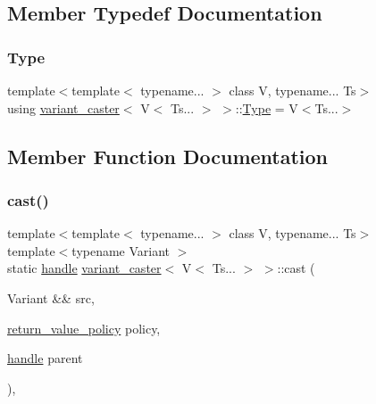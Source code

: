 \subsection{Member Typedef Documentation}
\mbox{\label{structvariant__caster_3_01_v_3_01_ts_8_8_8_01_4_01_4_af19893dac45401bbb67d1adfd284d463}} 
\subsubsection{\texorpdfstring{Type}{Type}}
{\footnotesize\ttfamily template$<$template$<$ typename... $>$ class V, typename... Ts$>$ \\
using \mbox{\hyperlink{structvariant__caster}{variant\+\_\+caster}}$<$ V$<$ Ts... $>$ $>$\+::\mbox{\hyperlink{structvariant__caster_3_01_v_3_01_ts_8_8_8_01_4_01_4_af19893dac45401bbb67d1adfd284d463}{Type}} =  V$<$Ts...$>$}



\subsection{Member Function Documentation}
\mbox{\label{structvariant__caster_3_01_v_3_01_ts_8_8_8_01_4_01_4_a4fc67a72a5dcdd1bfcdb2f99354b323a}} 
\subsubsection{\texorpdfstring{cast()}{cast()}}
{\footnotesize\ttfamily template$<$template$<$ typename... $>$ class V, typename... Ts$>$ \\
template$<$typename Variant $>$ \\
static \mbox{\hyperlink{classhandle}{handle}} \mbox{\hyperlink{structvariant__caster}{variant\+\_\+caster}}$<$ V$<$ Ts... $>$ $>$\+::cast (\begin{DoxyParamCaption}\item[{Variant \&\&}]{src,  }\item[{\mbox{\hyperlink{detail_2common_8h_adde72ab1fb0dd4b48a5232c349a53841}{return\+\_\+value\+\_\+policy}}}]{policy,  }\item[{\mbox{\hyperlink{classhandle}{handle}}}]{parent }\end{DoxyParamCaption})\hspace{0.3cm}{\ttfamily [inline]}, {\ttfamily [static]}}

